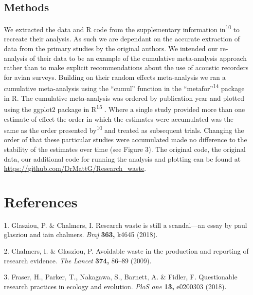 \documentclass[]{article}
\begin{document}
\hypertarget{methods}{%
\subsection{Methods}\label{methods}}

We extracted the data and R code from the supplementary information
in\textsuperscript{10} to recreate their analysis. As such we are
dependant on the accurate extraction of data from the primary studies by
the original authors. We intended our re-analysis of their data to be an
example of the cumulative meta-analysis approach rather than to make
explicit recommendations about the use of acoustic recorders for avian
surveys. Building on their random effects meta-analysis we ran a
cumulative meta-analysis using the ``cumul'' function in the
``metafor''\textsuperscript{14} package in R. The cumulative
meta-analysis was ordered by publication year and plotted using the
ggplot2 package in R\textsuperscript{15} . Where a single study provided
more than one estimate of effect the order in which the estimates were
accumulated was the same as the order presented by\textsuperscript{10}
and treated as subsequent trials. Changing the order of that these
particular studies were accumulated made no difference to the stability
of the estimates over time (see Figure 3). The original code, the
original data, our additional code for running the analysis and plotting
can be found at \url{https://github.com/DrMattG/Research_waste}.

\hypertarget{references}{%
\section*{References}\label{references}}

\hypertarget{refs}{}
\leavevmode\hypertarget{ref-glasziou2018research}{}%
1. Glasziou, P. \& Chalmers, I. Research waste is still a scandal---an
essay by paul glasziou and iain chalmers. \emph{Bmj} \textbf{363,} k4645
(2018).

\leavevmode\hypertarget{ref-chalmers2009avoidable}{}%
2. Chalmers, I. \& Glasziou, P. Avoidable waste in the production and
reporting of research evidence. \emph{The Lancet} \textbf{374,} 86--89
(2009).

\leavevmode\hypertarget{ref-fraser2018questionable}{}%
3. Fraser, H., Parker, T., Nakagawa, S., Barnett, A. \& Fidler, F.
Questionable research practices in ecology and evolution. \emph{PloS
one} \textbf{13,} e0200303 (2018).
\end{document}

